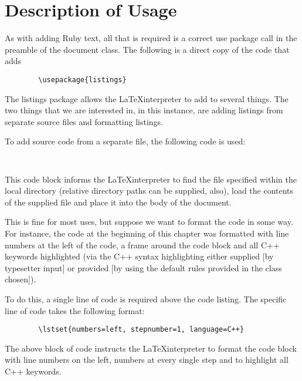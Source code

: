 \section{Description of Usage}
As with adding Ruby text, all that is required is a correct use package call in the preamble of the document class. The following is a direct copy of the code that adds

	\begin{lstlisting}
		\usepackage{listings}
	\end{lstlisting}

The listings package allows the \LaTeX interpreter to add to several things. The two things that we are interested in, in this instance, are adding listings from separate source files and formatting listings.
\par To add source code from a separate file, the following code is used:
	\begin{lstlisting}
		
	\end{lstlisting}
This code block informs the \LaTeX interpreter to find the file specified within the local directory (relative directory paths can be supplied, also), load the contents of the supplied file and place it into the body of the document.
\par This is fine for most uses, but suppose we want to format the code in some way. For instance, the code at the beginning of this chapter was formatted with line numbers at the left of the code, a frame around the code block and all C++ keywords highlighted (via the C++ syntax highlighting either supplied [by typesetter input] or provided [by using the default rules provided in the class chosen]).
\par To do this, a single line of code is required above the code listing. The specific line of code takes the following format:
	\begin{lstlisting}
		\lstset{numbers=left, stepnumber=1, language=C++}
	\end{lstlisting}
The above block of code instructs the \LaTeX interpreter to format the code block with line numbers on the left, numbers at every single step and to highlight all C++ keywords.